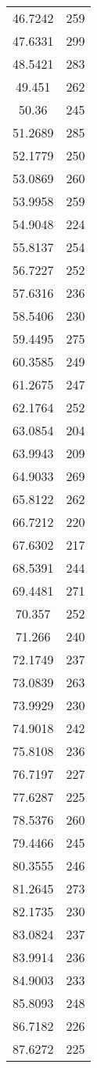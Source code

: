 \documentclass[10pt,a4paper]{article}
\begin{document}
\begin{table}[H]
\begin{tabular}{|c|c|}
46.7242 & 259 \\
47.6331 & 299 \\
48.5421 & 283 \\
49.451 & 262 \\
50.36 & 245 \\
51.2689 & 285 \\
52.1779 & 250 \\
53.0869 & 260 \\
53.9958 & 259 \\
54.9048 & 224 \\
55.8137 & 254 \\
56.7227 & 252 \\
57.6316 & 236 \\
58.5406 & 230 \\
59.4495 & 275 \\
60.3585 & 249 \\
61.2675 & 247 \\
62.1764 & 252 \\
63.0854 & 204 \\
63.9943 & 209 \\
64.9033 & 269 \\
65.8122 & 262 \\
66.7212 & 220 \\
67.6302 & 217 \\
68.5391 & 244 \\
69.4481 & 271 \\
70.357 & 252 \\
71.266 & 240 \\
72.1749 & 237 \\
73.0839 & 263 \\
73.9929 & 230 \\
74.9018 & 242 \\
75.8108 & 236 \\
76.7197 & 227 \\
77.6287 & 225 \\
78.5376 & 260 \\
79.4466 & 245 \\
80.3555 & 246 \\
81.2645 & 273 \\
82.1735 & 230 \\
83.0824 & 237 \\
83.9914 & 236 \\
84.9003 & 233 \\
85.8093 & 248 \\
86.7182 & 226 \\
87.6272 & 225 \\

\end{tabular}
\end{table}
\end{document}
